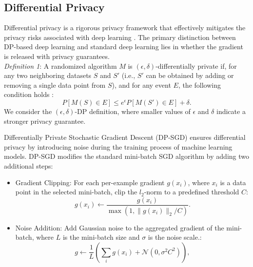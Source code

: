 \subsection{Differential Privacy}
Differential privacy \cite{dwork2006calibrating,dwork2014algorithmic} is a rigorous privacy framework that effectively mitigates the privacy risks associated with deep learning \cite{abadi2016deep}. The primary distinction between DP-based deep learning and standard deep learning lies in whether the gradient is released with privacy guarantees.\\
\textit{Definition 1}: A randomized algorithm  \( M \) is \((\epsilon, \delta)\)-differentially private if, for any two neighboring datasets \( S \) and \( S' \) (i.e., \( S' \) can be obtained by adding or removing a single data point from \( S \)), and for any event \( E \), the following condition holds :
\[ P[M(S) \in E] \leq e^\epsilon P[M(S') \in E] + \delta. \] 
We consider the \((\epsilon, \delta)\)-DP definition, where smaller values of \(\epsilon\) and \(\delta\) indicate a stronger privacy guarantee.

Differentially Private Stochastic Gradient Descent (DP-SGD) \cite{abadi2016deep} ensures differential privacy by introducing noise during the training process of machine learning models. DP-SGD modifies the standard mini-batch SGD algorithm by adding two additional steps:
\begin{itemize}
    \item Gradient Clipping: For each per-example gradient \( g(x_i) \), where \( x_i \) is a data point in the selected mini-batch, clip the \( l_2 \)-norm to a predefined threshold \( C \):  
   \[
   g(x_i) \gets \frac{g(x_i)}{\max(1, \|g(x_i)\|_2 / C)}.
   \]
   \item Noise Addition: Add Gaussian noise to the aggregated gradient of the mini-batch, where \( L \) is the mini-batch size and \( \sigma \) is the noise scale.:
   \[
   g \gets \frac{1}{L} \left( \sum_{i} g(x_i) + \mathcal{N}(0, \sigma^2 C^2) \right),
   \]
\end{itemize}
